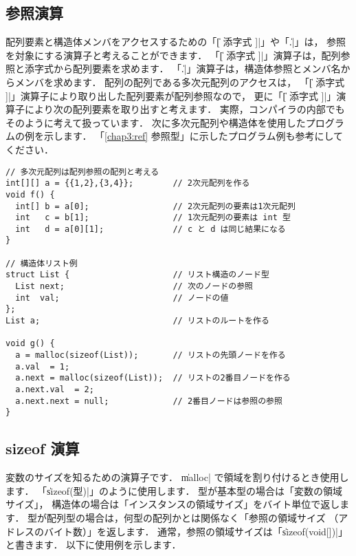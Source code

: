 \subsection{参照演算}

配列要素と構造体メンバをアクセスするための「\|[ 添字式 ]|」や「\|.|」は，
参照を対象にする演算子と考えることができます．
「\|[ 添字式 ]|」演算子は，配列参照と添字式から配列要素を求めます．
「\|.|」演算子は，構造体参照とメンバ名からメンバを求めます．
配列の配列である多次元配列のアクセスは，
「\|[ 添字式 ]|」演算子により取り出した配列要素が配列参照なので，
更に「\|[ 添字式 ]|」演算子により次の配列要素を取り出すと考えます．
実際，\cmm コンパイラの内部でもそのように考えて扱っています．
次に多次元配列や構造体を使用したプログラムの例を示します．
「\ref{chap3:ref} 参照型」に示したプログラム例も参考にしてください．

\begin{mylist}
\begin{verbatim}
// 多次元配列は配列参照の配列と考える
int[][] a = {{1,2},{3,4}};        // 2次元配列を作る
void f() {
  int[] b = a[0];                 // 2次元配列の要素は1次元配列
  int   c = b[1];                 // 1次元配列の要素は int 型
  int   d = a[0][1];              // c と d は同じ結果になる
}

// 構造体リスト例
struct List {                     // リスト構造のノード型
  List next;                      // 次のノードの参照
  int  val;                       // ノードの値
};
List a;                           // リストのルートを作る

void g() {
  a = malloc(sizeof(List));       // リストの先頭ノードを作る
  a.val  = 1;
  a.next = malloc(sizeof(List));  // リストの2番目ノードを作る
  a.next.val  = 2;
  a.next.next = null;             // 2番目ノードは参照の参照
}
\end{verbatim}
\end{mylist}

\subsection{sizeof 演算}

変数のサイズを知るための演算子です．
\|malloc| で領域を割り付けるとき使用します．
「\|sizeof(型)|」のように使用します．
型が基本型の場合は「変数の領域サイズ」，
構造体の場合は「インスタンスの領域サイズ」をバイト単位で返します．
型が配列型の場合は，何型の配列かとは関係なく「参照の領域サイズ
（アドレスのバイト数）」を返します．
通常，参照の領域サイズは「\|sizeof(void[])|」と書きます．
以下に使用例を示します．

